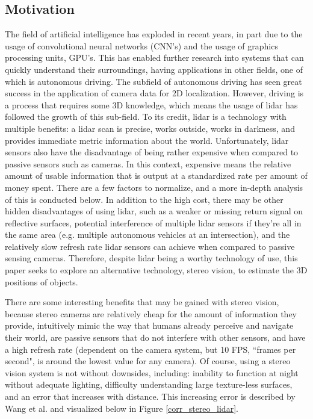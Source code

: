 \subsection{Motivation}
The field of artificial intelligence has exploded in recent years, in part due to the usage of convolutional neural networks (CNN's) and the usage of graphics processing units, GPU's. This has enabled further research into systems that can quickly understand their surroundings, having applications in other fields, one of which is autonomous driving. The subfield of autonomous driving has seen great success in the application of camera data for 2D localization. However, driving is a process that requires some 3D knowledge, which means the usage of lidar has followed the growth of this sub-field. To its credit, lidar is a technology with multiple benefits: a lidar scan is precise, works outside, works in darkness, and provides immediate metric information about the world. Unfortunately, lidar sensors also have the disadvantage of being rather expensive when compared to passive sensors such as cameras. In this context, expensive means the relative amount of usable information that is output at a standardized rate per amount of money spent. There are a few factors to normalize, and a more in-depth analysis of this is conducted below. In addition to the high cost, there may be other hidden disadvantages of using lidar, such as a weaker or missing return signal on reflective surfaces, potential interference of multiple lidar sensors if they're all in the same area (e.g. multiple autonomous vehicles at an intersection), and the relatively slow refresh rate lidar sensors can achieve when compared to passive sensing cameras. Therefore, despite lidar being a worthy technology of use, this paper seeks to explore an alternative technology, stereo vision, to estimate the 3D positions of objects.

There are some interesting benefits that may be gained with stereo vision, because stereo cameras are relatively cheap for the amount of information they provide, intuitively mimic the way that humans already perceive and navigate their world, are passive sensors that do not interfere with other sensors, and have a high refresh rate (dependent on the camera system, but 10 FPS, ``frames per second", is around the lowest value for any camera). Of course, using a stereo vision system is not without downsides, including: inability to function at night without adequate lighting, difficulty understanding large texture-less surfaces, and an error that increases with distance. This increasing error is described by Wang et al. \cite{wang_pseudo-lidar_2019} and visualized below in Figure \ref{corr_stereo_lidar}.

